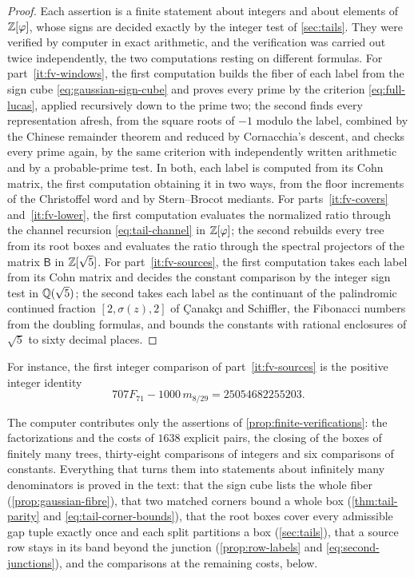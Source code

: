 \begin{proof}
Each assertion is a finite statement about integers and about elements of
$\mathbb{Z}[\varphi]$, whose signs are decided exactly by the integer test of
\cref{sec:tails}. They were verified by computer in exact arithmetic, and the
verification was carried out twice independently, the two computations
resting on different formulas. For part~\ref{it:fv-windows}, the first computation builds the
fiber of each label from the sign cube \eqref{eq:gaussian-sign-cube} and
proves every prime by the criterion \eqref{eq:full-lucas}, applied
recursively down to the prime two; the second finds every representation
afresh, from the square roots of $-1$ modulo the label, combined by the
Chinese remainder theorem and reduced by Cornacchia's descent, and checks
every prime again, by the same criterion with independently written
arithmetic and by a probable-prime test. In both, each label is computed
from its Cohn matrix, the first computation obtaining it in two ways, from the
floor increments of the Christoffel word and by Stern--Brocot mediants. For
parts~\ref{it:fv-covers} and~\ref{it:fv-lower}, the first computation evaluates the normalized ratio
through the channel recursion \eqref{eq:tail-channel} in $\mathbb{Z}[\varphi]$; the
second rebuilds every tree from its root boxes and evaluates the ratio
through the spectral projectors of the matrix $\mathsf B$ in $\mathbb{Z}[\sqrt5]$. For
part~\ref{it:fv-sources}, the first computation takes each label from its Cohn matrix and
decides the constant comparison by the integer sign test in $\mathbb{Q}(\sqrt5)$;
the second takes each label as the continuant of the palindromic continued
fraction $[2,\sigma(z),2]$ of \c{C}anak\c{c}{\i} and Schiffler, the Fibonacci
numbers from the doubling formulas, and bounds the constants with rational
enclosures of $\sqrt5$ to sixty decimal places.
\end{proof}

For instance, the first integer comparison of part~\ref{it:fv-sources} is the positive
integer identity
$$
 707F_{71}-1000\,m_{8/29}=25054682255203.
$$

\begin{remark}\label{rem:computer-contribution}
The computer contributes only the assertions of
\cref{prop:finite-verifications}: the factorizations and the costs of
$1638$ explicit pairs, the closing of the boxes of finitely many trees,
thirty-eight comparisons of integers and six comparisons of constants.
Everything that turns them into statements about infinitely many
denominators is proved in the text: that the sign cube lists the whole
fiber (\cref{prop:gaussian-fibre}), that two matched corners bound a whole
box (\cref{thm:tail-parity} and \eqref{eq:tail-corner-bounds}), that the
root boxes cover every admissible gap tuple exactly once and each split
partitions a box (\cref{sec:tails}), that a source row stays in its band
beyond the junction (\cref{prop:row-labels} and \eqref{eq:second-junctions}),
and the comparisons at the remaining costs, below.
\end{remark}

